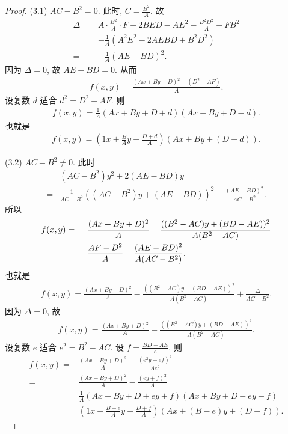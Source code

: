 \begin{proof}
    (3.1)
    \(AC - B^2 = 0\).
    此时, \(C = \frac{B^2}{A}\).
    故
    \begin{align*}
        \Delta
        = {} & A \cdot \frac{B^2}{A} \cdot F + 2BED - AE^2
        - \frac{B^2 D^2}{A} - FB^2                         \\
        = {} & {-\frac{1}{A}}
        (A^2 E^2 - 2AE BD + B^2 D^2)                       \\
        = {} & {-\frac{1}{A}} (AE - BD)^2.
    \end{align*}
    因为 \(\Delta = 0\),
    故 \(AE - BD = 0\).
    从而
    \begin{align*}
        f(x, y) = \frac{(Ax + By + D)^2 - (D^2 - AF)}{A}.
    \end{align*}
    设复数 \(d\) 适合 \(d^2 = D^2 - AF\).
    则
    \begin{align*}
        f(x, y) = \frac{1}{A} (Ax + By + D + d)(Ax + By + D - d).
    \end{align*}
    也就是
    \begin{align*}
        f(x, y) = \left( 1x + \frac{B}{A} y + \frac{D+d}{A} \right) (Ax + By + (D - d)).
    \end{align*}

    (3.2)
    \(AC - B^2 \neq 0\).
    此时
    \begin{align*}
             & (AC - B^2) y^2 + 2(AE - BD)y
        \\
        = {} & \frac{1}{AC - B^2} ((AC - B^2)y + (AE - BD))^2 - \frac{(AE - BD)^2}{AC - B^2}.
    \end{align*}
    所以
    \begin{align*}
        f(x, y)
        = {} &
        \hphantom{{} + {}}
        \frac{(Ax + By + D)^2}{A} - \frac{((B^2 - AC)y + (BD - AE))^2}{A(B^2 - AC)}
        \\
             &
        + \frac{AF - D^2}{A} - \frac{(AE - BD)^2}{A(AC - B^2)}.
    \end{align*}
    也就是
    \begin{align*}
        f(x, y) = \frac{(Ax + By + D)^2}{A} - \frac{((B^2 - AC)y + (BD - AE))^2}{A(B^2 - AC)} + \frac{\Delta}{AC - B^2}.
    \end{align*}
    因为 \(\Delta = 0\), 故
    \begin{align*}
        f(x, y) = \frac{(Ax + By + D)^2}{A} - \frac{((B^2 - AC)y + (BD - AE))^2}{A(B^2 - AC)}.
    \end{align*}
    设复数 \(e\) 适合 \(e^2 = B^2 - AC\).
    设 \(f = \frac{BD-AE}{e}\).
    则
    \begin{align*}
        f(x, y)
        = {} & \frac{(Ax + By + D)^2}{A} - \frac{(e^2 y + ef)^2}{Ae^2}                   \\
        = {} & \frac{(Ax + By + D)^2}{A} - \frac{(ey + f)^2}{A}                          \\
        = {} & \frac{1}{A}(Ax + By + D + ey + f)(Ax + By + D - ey - f)                   \\
        = {} & \left( 1x + \frac{B+e}{A}y + \frac{D+f}{A} \right) (Ax + (B-e)y + (D-f)).
    \end{align*}


\end{proof}
